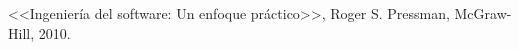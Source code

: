 \newpage
{}
\begin{thebibliography}{XX}
 <<Ingeniería del software: Un enfoque práctico>>, Roger S. Pressman, McGraw-Hill, 2010.\\
\end{thebibliography}